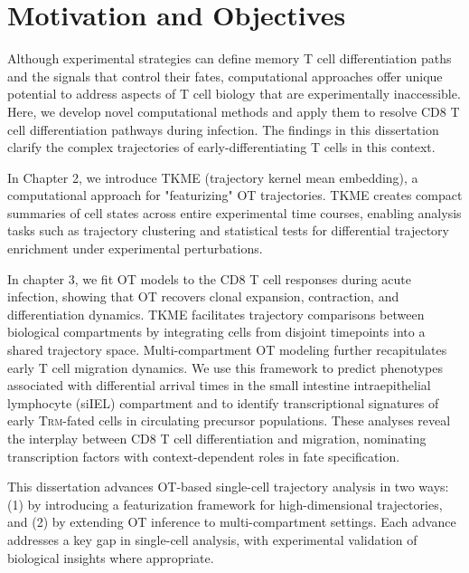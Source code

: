 \section{Motivation and Objectives}

Although experimental strategies can define memory T cell differentiation paths and the signals that control their fates, computational approaches offer unique potential to address aspects of T cell biology that are experimentally inaccessible. Here, we develop novel computational methods and apply them to resolve CD8 T cell differentiation pathways during infection. The findings in this dissertation clarify the complex trajectories of early-differentiating T cells in this context.

In Chapter 2, we introduce TKME (trajectory kernel mean embedding), a computational approach for "featurizing" OT trajectories. TKME creates compact summaries of cell states across entire experimental time courses, enabling analysis tasks such as trajectory clustering and statistical tests for differential trajectory enrichment under experimental perturbations.

In chapter 3, we fit OT models to the CD8 T cell responses during acute infection, showing that OT recovers clonal expansion, contraction, and differentiation dynamics. TKME facilitates trajectory comparisons between biological compartments by integrating cells from disjoint timepoints into a shared trajectory space. Multi-compartment OT modeling further recapitulates early T cell migration dynamics. We use this framework to predict phenotypes associated with differential arrival times in the small intestine intraepithelial lymphocyte (siIEL) compartment and to identify transcriptional signatures of early T\textsc{rm}-fated cells in circulating precursor populations. These analyses reveal the interplay between CD8 T cell differentiation and migration, nominating transcription factors with context-dependent roles in fate specification.

This dissertation advances OT-based single-cell trajectory analysis in two ways: (1) by introducing a featurization framework for high-dimensional trajectories, and (2) by extending OT inference to multi-compartment settings. Each advance addresses a key gap in single-cell analysis, with experimental validation of biological insights where appropriate.
